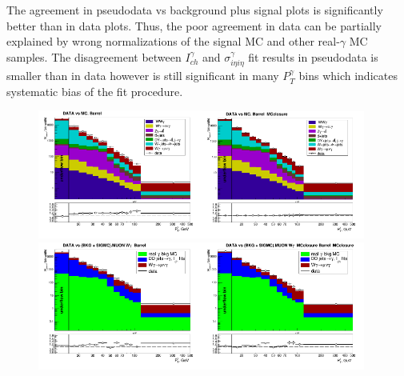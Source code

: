 The agreement in pseudodata vs background plus signal plots is significantly better than in data plots. Thus, the poor agreement in data can be partially explained by wrong normalizations of the signal MC and other real-$\gamma$ MC samples. The disagreement between $I_{ch}^{\gamma}$ and $\sigma_{i\eta i\eta}^{\gamma}$ fit results in pseudodata is smaller than in data however is still significant in many $P_T^{\gamma}$ bins which indicates systematic bias of the fit procedure.

\begin{figure}[htb]
  \begin{center}
\includegraphics[width=0.48\textwidth]{../figs/figs_v11/MUON_WGamma/PrepareYields/c_TotalDATAvsMC_Barrel__phoEt.png}\includegraphics[width=0.48\textwidth]{../figs/figs_v11/MUON_WGamma/PrepareYields/c_TotalDATAvsMC_Barrel__phoEt_MCclosure.png}\\
   \includegraphics[width=0.48\textwidth]{../figs/figs_v11/MUON_WGamma/PrepareYields/c_DATAvsBkgPlusSigMCc_MUON_WGamma_TEMPL_CHISO_UNblind__Barrel__phoEt.png}\includegraphics[width=0.48\textwidth]{../figs/figs_v11/MUON_WGamma/PrepareYields/c_DATAvsBkgPlusSigMCc_MUON_WGamma_TEMPL_CHISO_UNblind_MCclosure__Barrel__phoEt_MCclosure.png}\\

\end{center}
\end{figure}
